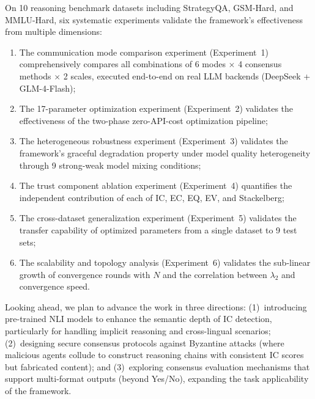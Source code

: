 \documentclass[12pt,a4paper]{article}
\begin{document}
On 10 reasoning benchmark datasets including StrategyQA, GSM-Hard, and MMLU-Hard, six systematic experiments validate the framework's effectiveness from multiple dimensions:
\begin{enumerate}[nosep]
    \item The communication mode comparison experiment (Experiment~1) comprehensively compares all combinations of 6 modes $\times$ 4 consensus methods $\times$ 2 scales, executed end-to-end on real LLM backends (DeepSeek + GLM-4-Flash);
    \item The 17-parameter optimization experiment (Experiment~2) validates the effectiveness of the two-phase zero-API-cost optimization pipeline;
    \item The heterogeneous robustness experiment (Experiment~3) validates the framework's graceful degradation property under model quality heterogeneity through 9 strong-weak model mixing conditions;
    \item The trust component ablation experiment (Experiment~4) quantifies the independent contribution of each of IC, EC, EQ, EV, and Stackelberg;
    \item The cross-dataset generalization experiment (Experiment~5) validates the transfer capability of optimized parameters from a single dataset to 9 test sets;
    \item The scalability and topology analysis (Experiment~6) validates the sub-linear growth of convergence rounds with $N$ and the correlation between $\lambda_2$ and convergence speed.
\end{enumerate}

Looking ahead, we plan to advance the work in three directions: (1)~introducing pre-trained NLI models to enhance the semantic depth of IC detection, particularly for handling implicit reasoning and cross-lingual scenarios; (2)~designing secure consensus protocols against Byzantine attacks (where malicious agents collude to construct reasoning chains with consistent IC scores but fabricated content); and (3)~exploring consensus evaluation mechanisms that support multi-format outputs (beyond Yes/No), expanding the task applicability of the framework.
\end{document}
